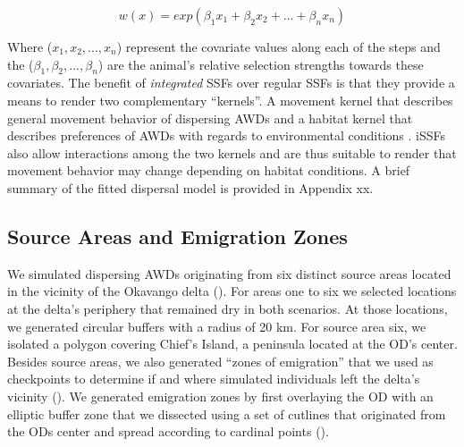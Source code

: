 \documentclass[abstract=on,10pt,a4paper,bibliography=totocnumbered]{article}
\begin{document}
\begin{equation}
\label{EQ1}
  w(x) = exp(\beta_1 x_1 + \beta_2 x_2 + ... + \beta_n x_n)
\end{equation}

Where (\(x_1, x_2, ..., x_n\)) represent the covariate values along each of the
steps and the (\(\beta_1, \beta_2, ..., \beta_n\)) are the animal's relative
selection strengths \citealp{Avgar.2017} towards these covariates. The benefit
of \textit{integrated} SSFs over regular SSFs is that they provide a means to
render two complementary ``kernels''. A movement kernel that describes general
movement behavior of dispersing AWDs and a habitat kernel that describes
preferences of AWDs with regards to environmental conditions
\citep{Fieberg.2021}. iSSFs also allow interactions among the two kernels and
are thus suitable to render that movement behavior may change depending on
habitat conditions. A brief summary of the fitted dispersal model is provided in
Appendix xx.

\subsection{Source Areas and Emigration Zones}
We simulated dispersing AWDs originating from six distinct source areas located
in the vicinity of the Okavango delta (). For areas one to six
we selected locations at the delta's periphery that remained dry in both
scenarios. At those locations, we generated circular buffers with a radius of 20
km. For source area six, we isolated a polygon covering Chief's Island, a
peninsula located at the OD's center. Besides source areas, we also generated
``zones of emigration'' that we used as checkpoints to determine if and where
simulated individuals left the delta's vicinity (). We generated
emigration zones by first overlaying the OD with an elliptic buffer zone that we
dissected using a set of cutlines that originated from the ODs center and spread
according to cardinal points ().
\end{document}
